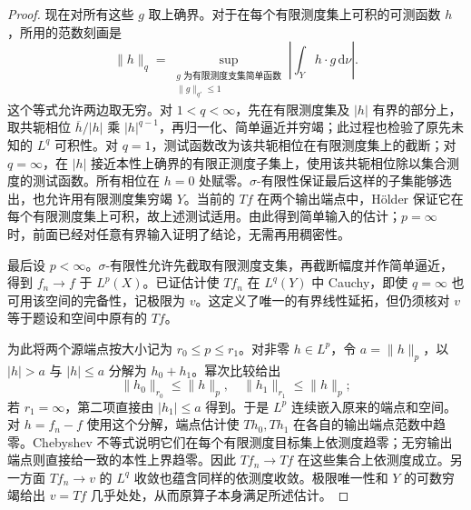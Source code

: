 \begin{proof}
现在对所有这些 \(g\) 取上确界。对于在每个有限测度集上可积的可测函数 \(h\)，所用的范数刻画是
\[
 \|h\|_q
 =\sup_{\substack{g\text{ 为有限测度支集简单函数}\\\|g\|_{q'}\leq1}}
 \left|\int_Y h\cdot g\,\mathrm d\nu\right|.
\]
这个等式允许两边取无穷。对 \(1<q<\infty\)，先在有限测度集及 \(|h|\) 有界的部分上，取共轭相位 \(\overline h/|h|\) 乘 \(|h|^{q-1}\)，再归一化、简单逼近并穷竭；此过程也检验了原先未知的 \(L^q\) 可积性。对 \(q=1\)，测试函数改为该共轭相位在有限测度集上的截断；对 \(q=\infty\)，在 \(|h|\) 接近本性上确界的有限正测度子集上，使用该共轭相位除以集合测度的测试函数。所有相位在 \(h=0\) 处赋零。\(\sigma\)-有限性保证最后这样的子集能够选出，也允许用有限测度集穷竭 \(Y\)。当前的 \(Tf\) 在两个输出端点中，Hölder 保证它在每个有限测度集上可积，故上述测试适用。由此得到简单输入的估计；\(p=\infty\) 时，前面已经对任意有界输入证明了结论，无需再用稠密性。

最后设 \(p<\infty\)。\(\sigma\)-有限性允许先截取有限测度支集，再截断幅度并作简单逼近，得到 \(f_n\rightarrow f\) 于 \(L^p(X)\)。已证估计使 \(Tf_n\) 在 \(L^q(Y)\) 中 Cauchy，即使 \(q=\infty\) 也可用该空间的完备性，记极限为 \(v\)。这定义了唯一的有界线性延拓，但仍须核对 \(v\) 等于题设和空间中原有的 \(Tf\)。

为此将两个源端点按大小记为 \(r_0\leq p\leq r_1\)。对非零 \(h\in L^p\)，令 \(a=\|h\|_p\)，以 \(|h|>a\) 与 \(|h|\leq a\) 分解为 \(h_0+h_1\)。幂次比较给出
\[
 \|h_0\|_{r_0}\leq\|h\|_p,
 \quad \|h_1\|_{r_1}\leq\|h\|_p;
\]
若 \(r_1=\infty\)，第二项直接由 \(|h_1|\leq a\) 得到。于是 \(L^p\) 连续嵌入原来的端点和空间。对 \(h=f_n-f\) 使用这个分解，端点估计使 \(T h_0,T h_1\) 在各自的输出端点范数中趋零。Chebyshev 不等式说明它们在每个有限测度目标集上依测度趋零；无穷输出端点则直接给一致的本性上界趋零。因此 \(Tf_n\rightarrow Tf\) 在这些集合上依测度成立。另一方面 \(Tf_n\rightarrow v\) 的 \(L^q\) 收敛也蕴含同样的依测度收敛。极限唯一性和 \(Y\) 的可数穷竭给出 \(v=Tf\) 几乎处处，从而原算子本身满足所述估计。
\end{proof}

